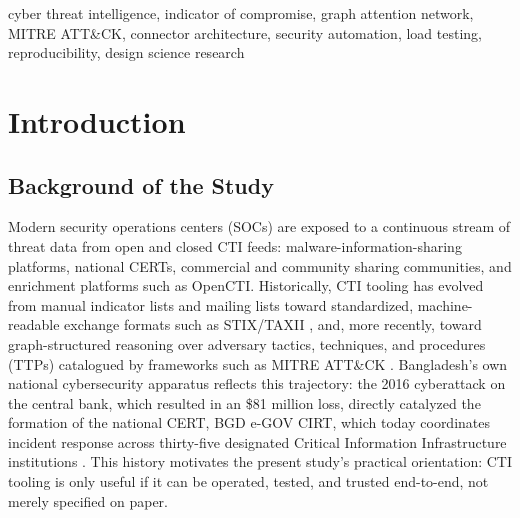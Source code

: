 \documentclass[conference]{IEEEtran}
\begin{document}
\begin{IEEEkeywords}
cyber threat intelligence, indicator of compromise, graph attention network, MITRE ATT\&CK, connector architecture, security automation, load testing, reproducibility, design science research
\end{IEEEkeywords}

\section{Introduction}

\subsection{Background of the Study}
Modern security operations centers (SOCs) are exposed to a continuous stream of threat data from open and closed CTI feeds: malware-information-sharing platforms, national CERTs, commercial and community sharing communities, and enrichment platforms such as OpenCTI. Historically, CTI tooling has evolved from manual indicator lists and mailing lists toward standardized, machine-readable exchange formats such as STIX/TAXII \cite{stix21}, and, more recently, toward graph-structured reasoning over adversary tactics, techniques, and procedures (TTPs) catalogued by frameworks such as MITRE ATT\&CK \cite{strom2018attack}. Bangladesh's own national cybersecurity apparatus reflects this trajectory: the 2016 cyberattack on the central bank, which resulted in an \$81 million loss, directly catalyzed the formation of the national CERT, BGD e-GOV CIRT, which today coordinates incident response across thirty-five designated Critical Information Infrastructure institutions \cite{bgdcirt}. This history motivates the present study's practical orientation: CTI tooling is only useful if it can be operated, tested, and trusted end-to-end, not merely specified on paper.
\end{document}
